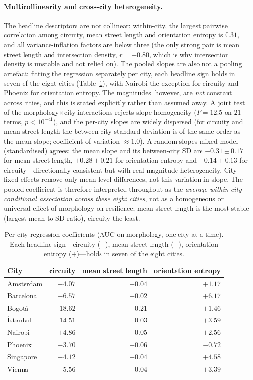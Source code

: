 \paragraph{Multicollinearity and cross-city heterogeneity.} The headline descriptors
are not collinear: within-city, the largest pairwise correlation among circuity, mean
street length and orientation entropy is $0.31$, and all variance-inflation factors
are below three (the only strong pair is mean street length and intersection density,
$r=-0.80$, which is why intersection density is unstable and not relied on). The
pooled slopes are also not a pooling artefact: fitting the regression separately per
city, each headline sign holds in seven of the eight cities (Table~\ref{tab:hetero}),
with Nairobi the exception for circuity and Phoenix for orientation entropy.
The magnitudes, however, are \emph{not} constant across cities, and this is stated
explicitly rather than assumed away. A joint test of the morphology$\times$city
interactions rejects slope homogeneity ($F=12.5$ on $21$ terms,
$p<10^{-41}$), and the per-city slopes are widely dispersed (for circuity and mean
street length the between-city standard deviation is of the same order as the mean
slope; coefficient of variation $\approx1.0$). A random-slopes mixed model
(standardised) agrees: the mean slope and its between-city SD are
$-0.31\pm0.17$ for mean street length, $+0.28\pm0.21$ for orientation entropy and
$-0.14\pm0.13$ for circuity---directionally consistent but with real magnitude
heterogeneity. City fixed effects remove only mean-level differences, not this
variation in slope. The pooled coefficient is therefore interpreted throughout as the
\emph{average within-city conditional association across these eight cities}, not as a
homogeneous or universal effect of morphology on resilience; mean street length is the
most stable (largest mean-to-SD ratio), circuity the least.

\begin{table}[t]\centering
\caption{Per-city regression coefficients (AUC on morphology, one city at a time).
Each headline sign---circuity ($-$), mean street length ($-$), orientation entropy
($+$)---holds in seven of the eight cities.}
\label{tab:hetero}
\begin{tabular}{lrrr}
\toprule
City & circuity & mean street length & orientation entropy\\
\midrule
Amsterdam & $-4.07$ & $-0.04$ & $+1.17$\\
Barcelona & $-6.57$ & $+0.02$ & $+6.17$\\
Bogotá    & $-18.62$ & $-0.21$ & $+1.46$\\
İstanbul  & $-14.51$ & $-0.03$ & $+3.59$\\
Nairobi   & $+4.86$ & $-0.05$ & $+2.56$\\
Phoenix   & $-3.70$ & $-0.06$ & $-0.72$\\
Singapore & $-4.12$ & $-0.04$ & $+4.58$\\
Vienna    & $-5.56$ & $-0.04$ & $+3.39$\\
\bottomrule
\end{tabular}
\end{table}

